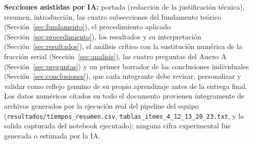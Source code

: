 \documentclass[11pt,a4paper]{article}
\begin{document}
\textbf{Secciones asistidas por IA:} portada (redacci\'on de la
justificaci\'on t\'ecnica), resumen, introducci\'on, las cuatro subsecciones
del fundamento te\'orico (Secci\'on~\ref{sec:fundamento}), el procedimiento
aplicado (Secci\'on~\ref{sec:procedimiento}), los resultados y su
interpretaci\'on (Secci\'on~\ref{sec:resultados}), el an\'alisis cr\'itico con
la sustituci\'on num\'erica de la fracci\'on serial
(Secci\'on~\ref{sec:analisis}), las cuatro preguntas del Anexo A
(Secci\'on~\ref{sec:preguntas}) y un primer borrador de las conclusiones
individuales (Secci\'on~\ref{sec:conclusiones}), que cada integrante debe
revisar, personalizar y validar como reflejo genuino de su propio aprendizaje
antes de la entrega final. Los datos num\'ericos citados en todo el documento
provienen \'integramente de archivos generados por la ejecuci\'on real del
pipeline del equipo (\texttt{resultados/tiempos\_resumen.csv},
\texttt{tablas\_items\_4\_12\_13\_20\_23.txt}, y la salida capturada del
notebook ejecutado); ninguna cifra experimental fue generada o estimada por
la IA.

\newpage


\end{document}
